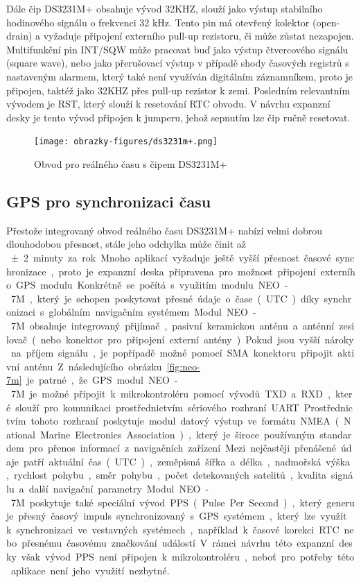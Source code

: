 Dále čip DS3231M+ obsahuje vývod 32KHZ, slouží jako výstup stabilního hodinového signálu o frekvenci 32 kHz. Tento pin má otevřený kolektor (open-drain) a vyžaduje připojení externího pull-up rezistoru, či může zůstat nezapojen. Multifunkční pin INT/SQW může pracovat buď jako výstup čtvercového signálu (square wave), nebo jako přerušovací výstup v případě shody časových registrů s nastaveným alarmem, který také není využíván digitálním záznamníkem, proto je připojen, taktéž jako 32KHZ přes pull-up rezistor k zemi. Posledním relevantním vývodem je RST, který slouží k resetování RTC obvodu. V návrhu expanzní desky je tento vývod připojen k jumperu, jehož sepnutím lze čip ručně resetovat.

\begin{figure}[h]
    \centering
    \texttt{[image: obrazky-figures/ds3231m+.png]}
    
    \caption{Obvod pro reálného času s čipem DS3231M+}
    \label{fig:ds3231m+}
\end{figure}

\subsection{GPS pro synchronizaci času}
Přestože integrovaný obvod reálného času DS3231M+ nabízí velmi dobrou dlouhodobou přesnost, stále jeho odchylka může činit až \SI{\pm2} minuty za rok. Mnoho aplikací vyžaduje ještě vyšší přesnost časové synchronizace, proto je expanzní deska připravena pro možnost připojení externího GPS modulu. Konkrétně se počítá s využitím modulu NEO-7M, který je schopen poskytovat přesné údaje o čase (UTC) díky synchronizaci s globálním navigačním systémem.

Modul NEO-7M obsahuje integrovaný přijímač, pasivní keramickou anténu a anténní zesilovač (nebo konektor pro připojení externí antény). Pokud jsou vyšší nároky na příjem signálu, je popřípadě možné pomocí SMA konektoru připojit aktivní anténu. Z následujícího obrázku~\ref{fig:neo-7m} je patrné, že GPS modul NEO-7M je možné připojit k mikrokontroléru pomocí vývodů TXD a RXD, které slouží pro komunikaci prostřednictvím sériového rozhraní UART. Prostřednictvím tohoto rozhraní poskytuje modul datový výstup ve formátu NMEA (National Marine Electronics Association), který je široce používaným standardem pro přenos informací z navigačních zařízení. Mezi nejčastěji přenášené údaje patří aktuální čas (UTC), zeměpisná šířka a délka, nadmořská výška, rychlost pohybu, směr pohybu, počet detekovaných satelitů, kvalita signálu a další navigační parametry. Modul NEO-7M poskytuje také speciální vývod PPS (Pulse Per Second), který generuje přesný časový impuls synchronizovaný s GPS systémem, který lze využít k synchronizaci ve vestavných systémech, například k časové korekci RTC nebo přesnému časovému značkování událostí. V rámci návrhu této expanzní desky však vývod PPS není připojen k mikrokontroléru, neboť pro potřeby této aplikace není jeho využití nezbytné.

